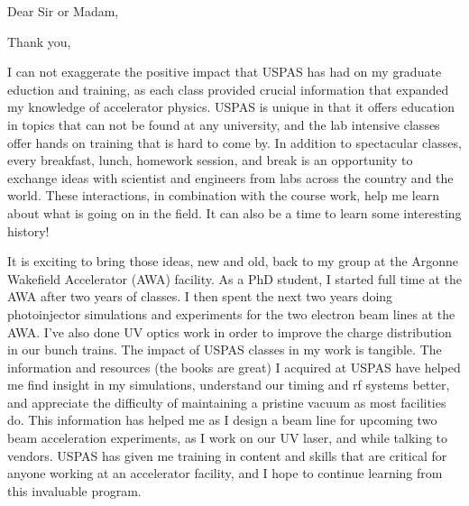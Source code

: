 \documentclass[11pt,a4paper,sans]{moderncv}        %
\begin{document}
\clearpage
\date{August 15, 2017}
\opening{Dear Sir or Madam,}
\closing{Thank you,}
\makelettertitle

I can not exaggerate the positive impact that USPAS has had on my graduate eduction and training, 
as each class provided crucial information that expanded my knowledge of accelerator physics. 
USPAS is unique in that it offers education in 
topics that can not be found at any university, and the lab intensive classes offer hands on training 
that is hard to come by. In addition to spectacular classes, every breakfast, lunch, homework session, 
and break is an opportunity to exchange ideas with scientist and engineers from labs across the country and the world.
These interactions, in combination with the course work, help me learn about what is going on in the field.
It can also be a time to learn some interesting history!

It is exciting to bring those ideas, new and old, back to my group at the 
Argonne Wakefield Accelerator (AWA) facility. As a PhD student, I started full time at the AWA 
after two years of classes. I then spent the next two years doing photoinjector 
simulations and experiments for the two electron beam lines at the AWA. 
I've also done UV optics work in order to improve the charge distribution in our bunch trains. 
The impact of USPAS classes in my work is tangible. The information and resources (the books are great) 
I acquired at USPAS have helped me find insight in my simulations, understand our timing and rf systems better, 
and appreciate the difficulty of maintaining a pristine vacuum as most facilities do. This information has helped me 
as I design a beam line for upcoming two beam acceleration experiments, as I work on our UV laser, and while
talking to vendors. USPAS has given me training in content and skills that are critical for anyone working
at an accelerator facility, and I hope to continue learning from this invaluable program.

\makeletterclosing

\end{document}
